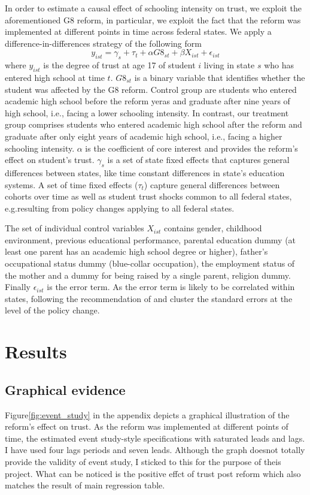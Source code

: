 \documentclass[11pt, a4paper, leqno]{article}
\begin{document}
In order to estimate a causal effect of schooling intensity on trust, we exploit the aforementioned G8 reform, in particular,  we exploit the fact that 
the reform was implemented at different points in time across federal states. We apply a difference-in-differences strategy of the following form   
\begin{equation}
   y_{ist}= \gamma_{s} + \tau_{t} + \alpha G8_{st} + \beta X_{ist} +  \epsilon_{ist}
   \label{eqn:main_eqn}
\end{equation}
where $y_{ist}$ is the degree of trust at age 17 of student $i$ living in state $s$ who has entered high school at time $t$. $G8_{st}$ is a binary variable 
that identifies whether the student was affected by the G8 reform. Control group are students who entered academic high school before the reform yeras and graduate 
after nine years of high school, i.e., facing a lower schooling intensity. In contrast, our treatment group comprises students who entered academic high school 
after the reform and graduate after only eight years of academic high school, i.e., facing a higher schooling intensity. $\alpha$ is the coefficient of core interest 
and provides the reform's effect on student's trust. $\gamma_{s}$ is a set of state fixed effects that captures general differences between states, like time constant 
differences in state's education systems. A set of time fixed effects ($\tau_{t}$) capture general differences between cohorts over time as well as student trust shocks 
common to all federal states, e.g.resulting from policy changes applying to all federal states.\par The set of individual control variables $X_{ist}$ contains gender, 
childhood environment, previous educational performance, parental education dummy (at least one parent has an academic high school degree or higher), father's occupational status 
dummy (blue-collar occupation), the employment status of the mother and a dummy for being raised by a single parent, religion dummy.  Finally $\epsilon_{ist}$ is the error term. 
As the error term is likely to be correlated within states, following the recommendation of \citep{bertrand2004much} and cluster the standard errors at the level 
of the policy change.

\section{Results\label{sec:results}}
\subsection{Graphical evidence}
Figure\ref{fig:event_study} in the appendix depicts a graphical illustration of the reform's effect on trust. As the reform was implemented at different points of time, 
the estimated event study-style specifications with saturated leads and lags. I have used four lags periods and seven leads. Although the graph doesnot totally provide 
the validity of event study, I sticked to this for the purpose of theis project. What can be noticed is the positive effct of trust post reform which also matches the 
result of main regression table. 
\end{document}
